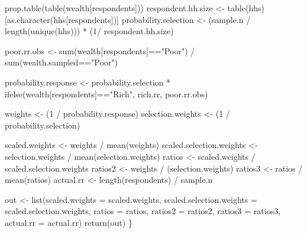 \documentclass[
]{article}
\newenvironment{Shaded}{\begin{snugshade}}{\end{snugshade}}
\newcommand{\AttributeTok}[1]{\textcolor[rgb]{0.77,0.63,0.00}{#1}}
\newcommand{\DecValTok}[1]{\textcolor[rgb]{0.00,0.00,0.81}{#1}}
\newcommand{\FunctionTok}[1]{\textcolor[rgb]{0.00,0.00,0.00}{#1}}
\newcommand{\NormalTok}[1]{#1}
\newcommand{\OtherTok}[1]{\textcolor[rgb]{0.56,0.35,0.01}{#1}}
\newcommand{\SpecialCharTok}[1]{\textcolor[rgb]{0.00,0.00,0.00}{#1}}
\newcommand{\StringTok}[1]{\textcolor[rgb]{0.31,0.60,0.02}{#1}}
\begin{document}
\begin{Shaded}
\begin{Highlighting}[]
  \FunctionTok{prop.table}\NormalTok{(}\FunctionTok{table}\NormalTok{(wealth[respondents]))}
\NormalTok{  respondent.hh.size }\OtherTok{\textless{}{-}} \FunctionTok{table}\NormalTok{(hhs)[}\FunctionTok{as.character}\NormalTok{(hhs[respondents])]}
\NormalTok{  probability.selection }\OtherTok{\textless{}{-}}\NormalTok{ (sample.n }\SpecialCharTok{/} \FunctionTok{length}\NormalTok{(}\FunctionTok{unique}\NormalTok{(hhs))) }\SpecialCharTok{*} 
\NormalTok{    (}\DecValTok{1}\SpecialCharTok{/}\NormalTok{ respondent.hh.size)}
  
\NormalTok{  poor.rr.obs }\OtherTok{\textless{}{-}} \FunctionTok{sum}\NormalTok{(wealth[respondents]}\SpecialCharTok{==}\StringTok{"Poor"}\NormalTok{) }\SpecialCharTok{/} \FunctionTok{sum}\NormalTok{(wealth.sampled}\SpecialCharTok{==}\StringTok{"Poor"}\NormalTok{)}
  
\NormalTok{  probability.response }\OtherTok{\textless{}{-}}\NormalTok{ probability.selection }\SpecialCharTok{*} 
    \FunctionTok{ifelse}\NormalTok{(wealth[respondents]}\SpecialCharTok{==}\StringTok{"Rich"}\NormalTok{, rich.rr, poor.rr.obs)}
  
\NormalTok{  weights }\OtherTok{\textless{}{-}}\NormalTok{ (}\DecValTok{1} \SpecialCharTok{/}\NormalTok{ probability.response)}
\NormalTok{  selection.weights }\OtherTok{\textless{}{-}}\NormalTok{ (}\DecValTok{1} \SpecialCharTok{/}\NormalTok{ probability.selection)}
  
\NormalTok{  scaled.weights }\OtherTok{\textless{}{-}}\NormalTok{ weights }\SpecialCharTok{/} \FunctionTok{mean}\NormalTok{(weights)}
\NormalTok{  scaled.selection.weights }\OtherTok{\textless{}{-}}\NormalTok{ selection.weights }\SpecialCharTok{/} \FunctionTok{mean}\NormalTok{(selection.weights)}
\NormalTok{  ratios }\OtherTok{\textless{}{-}}\NormalTok{ scaled.weights }\SpecialCharTok{/}\NormalTok{ scaled.selection.weights}
\NormalTok{  ratios2 }\OtherTok{\textless{}{-}}\NormalTok{ weights }\SpecialCharTok{/}\NormalTok{ (selection.weights) }
\NormalTok{  ratios3 }\OtherTok{\textless{}{-}}\NormalTok{ ratios }\SpecialCharTok{/} \FunctionTok{mean}\NormalTok{(ratios)}
\NormalTok{  actual.rr }\OtherTok{\textless{}{-}} \FunctionTok{length}\NormalTok{(respondents) }\SpecialCharTok{/}\NormalTok{ sample.n}
  
\NormalTok{  out }\OtherTok{\textless{}{-}} \FunctionTok{list}\NormalTok{(}\AttributeTok{scaled.weights =}\NormalTok{ scaled.weights, }
              \AttributeTok{scaled.selection.weights =}\NormalTok{ scaled.selection.weights, }
              \AttributeTok{ratios =}\NormalTok{ ratios, }\AttributeTok{ratios2 =}\NormalTok{ ratios2,}
              \AttributeTok{ratios3 =}\NormalTok{ ratios3,}
              \AttributeTok{actual.rr =}\NormalTok{ actual.rr)}
  \FunctionTok{return}\NormalTok{(out)}
\NormalTok{\}}


\end{Highlighting}
\end{Shaded}
\end{document}
